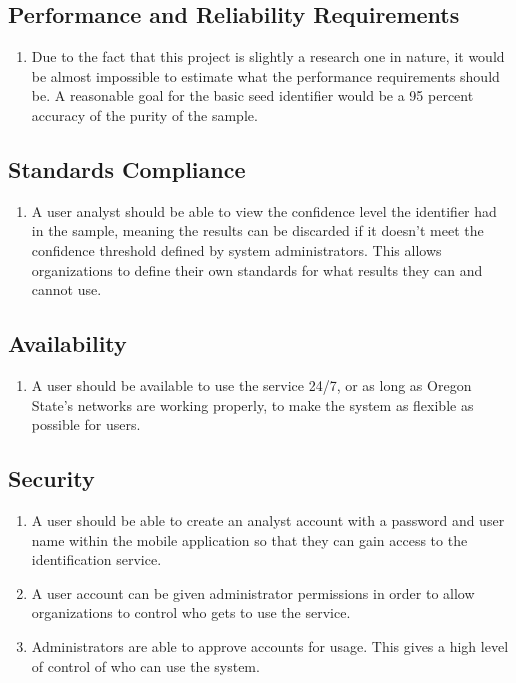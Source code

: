 \documentclass[onecolumn, draftclsnofoot,10pt, compsoc]{IEEEtran}
\begin{document}
\subsection{Performance and Reliability Requirements}
\begin{enumerate}
\item
Due to the fact that this project is slightly a research one in nature, it would be almost impossible to estimate what the performance requirements should be. A reasonable goal for the basic seed identifier would be a 95 percent accuracy of the purity of the sample. 
\end{enumerate}
\subsection{Standards Compliance}
\begin{enumerate}
\item
A user analyst should be able to view the confidence level the identifier had in the sample, meaning the results can be discarded if it doesn't meet the confidence threshold defined by system administrators. This allows organizations to define their own standards for what results they can and cannot use.
\end{enumerate}
\subsection{Availability}
\begin{enumerate}
\item
A user should be available to use the service 24/7, or as long as Oregon State's networks are working properly, to make the system as flexible as possible for users.
\end{enumerate}
\subsection{Security}

\begin{enumerate}
\item
A user should be able to create an analyst account with a password and user name within the mobile application so that they can gain access to the identification service.
\item
A user account can be given administrator permissions in order to allow organizations to control who gets to use the service. 
\item
Administrators are able to approve accounts for usage. This gives a high level of control of who can use the system.
\end{enumerate}
\end{document}
